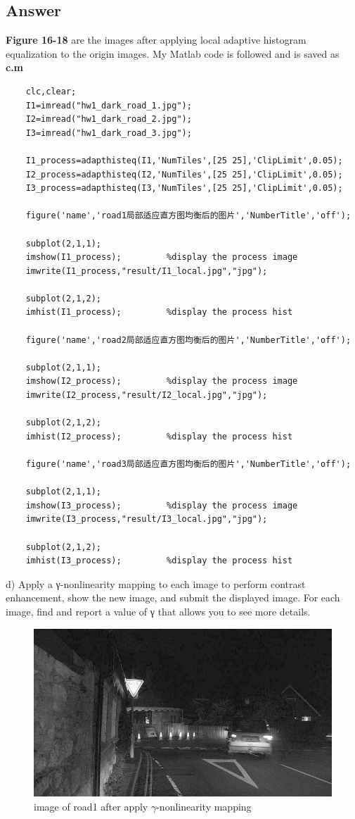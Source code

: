 \documentclass[
	12pt, %
]{fphw}
\begin{document}
\subsection*{Answer} 
\textbf{Figure 16-18} are the images after applying local adaptive histogram equalization to the origin images.
My Matlab code is followed and is saved as \textbf{c.m}
\begin{lstlisting}
	clc,clear;
	I1=imread("hw1_dark_road_1.jpg");
	I2=imread("hw1_dark_road_2.jpg");
	I3=imread("hw1_dark_road_3.jpg");

	I1_process=adapthisteq(I1,'NumTiles',[25 25],'ClipLimit',0.05);
	I2_process=adapthisteq(I2,'NumTiles',[25 25],'ClipLimit',0.05); 
	I3_process=adapthisteq(I3,'NumTiles',[25 25],'ClipLimit',0.05); 

	figure('name','road1局部适应直方图均衡后的图片','NumberTitle','off');

	subplot(2,1,1);
	imshow(I1_process);         %display the process image
	imwrite(I1_process,"result/I1_local.jpg","jpg");
			
	subplot(2,1,2);
	imhist(I1_process);         %display the process hist

	figure('name','road2局部适应直方图均衡后的图片','NumberTitle','off');

	subplot(2,1,1);
	imshow(I2_process);         %display the process image
	imwrite(I2_process,"result/I2_local.jpg","jpg");
			
	subplot(2,1,2);
	imhist(I2_process);         %display the process hist

	figure('name','road3局部适应直方图均衡后的图片','NumberTitle','off');

	subplot(2,1,1);
	imshow(I3_process);         %display the process image
	imwrite(I3_process,"result/I3_local.jpg","jpg");
			
	subplot(2,1,2);
	imhist(I3_process);         %display the process hist
\end{lstlisting}
\begin{problem}
	d)  Apply a γ-nonlinearity mapping to each image to perform contrast enhancement, show the new image, and
	submit the displayed image. For each image, find and report a value of γ that allows you to see more details.
	
\end{problem}
\begin{figure}[H]
 
	\centering
	\includegraphics[width=1\columnwidth]{T2/result/I1_gama.jpg} 
	\caption{image of road1 after apply $\gamma$-nonlinearity mapping}
	\label{fig22}
\end{figure}
\end{document}
